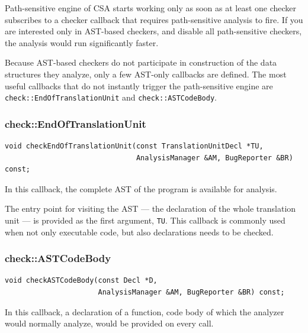 \documentclass[a4paper,12pt]{article}
\newenvironment{nobr}{\begin{minipage}{\textwidth}\setlength\parskip{1em}
}{\end{minipage}\ignorespacesafterend}
\begin{document}
Path-sensitive engine of CSA starts working only as soon as at least one checker subscribes to a checker callback that requires path-sensitive analysis to fire. If you are interested only in AST-based checkers, and disable all path-sensitive checkers, the analysis would run significantly faster.

Because AST-based checkers do not participate in construction of the data structures they analyze, only a few AST-only callbacks are defined. The most useful callbacks that do not instantly trigger the path-sensitive engine are \lstinline|check::EndOfTranslationUnit| and \lstinline|check::ASTCodeBody|.

\begin{nobr}
\subsubsection{check::EndOfTranslationUnit}

\begin{lstlisting}[style=cplusplus,numbers=none]
void checkEndOfTranslationUnit(const TranslationUnitDecl *TU,
                               AnalysisManager &AM, BugReporter &BR) const;
\end{lstlisting}

In this callback, the complete AST of the program is available for analysis.
\end{nobr}

The entry point for visiting the AST --- the declaration of the whole translation unit --- is provided as the first argument, \lstinline|TU|. This callback is commonly used when not only executable code, but also declarations needs to be checked.

\begin{nobr}
\subsubsection{check::ASTCodeBody}

\begin{lstlisting}[style=cplusplus,numbers=none]
void checkASTCodeBody(const Decl *D,
                      AnalysisManager &AM, BugReporter &BR) const;
\end{lstlisting}

In this callback, a declaration of a function, code body of which the analyzer would normally analyze, would be provided on every call.
\end{nobr}
\end{document}
